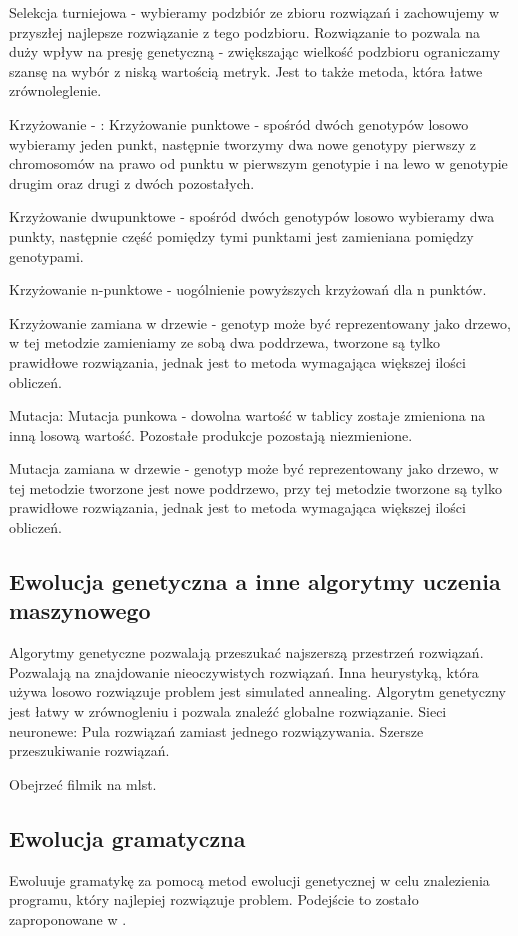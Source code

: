 Selekcja turniejowa - wybieramy podzbiór ze zbioru rozwiązań i zachowujemy w przyszłej najlepsze rozwiązanie z tego podzbioru.
Rozwiązanie to pozwala na duży wpływ na presję genetyczną - zwiększając wielkość podzbioru ograniczamy szansę na wybór z niską wartością metryk.  Jest to także metoda, która łatwe zrównoleglenie.

Krzyżowanie - :
Krzyżowanie punktowe - spośród dwóch genotypów losowo wybieramy jeden punkt, następnie tworzymy dwa nowe genotypy pierwszy z chromosomów na prawo od punktu w pierwszym genotypie i na lewo w genotypie drugim oraz drugi z dwóch pozostałych.

Krzyżowanie dwupunktowe - spośród dwóch genotypów losowo wybieramy dwa punkty, następnie część pomiędzy tymi punktami jest zamieniana pomiędzy genotypami.

Krzyżowanie n-punktowe - uogólnienie powyższych krzyżowań dla n punktów.

Krzyżowanie zamiana w drzewie - genotyp może być reprezentowany jako drzewo, w tej metodzie zamieniamy ze sobą dwa poddrzewa, tworzone są tylko prawidłowe rozwiązania, jednak jest to metoda wymagająca większej ilości obliczeń. 


Mutacja:
Mutacja punkowa - dowolna wartość w tablicy zostaje zmieniona na inną losową wartość. Pozostałe produkcje pozostają niezmienione.

Mutacja zamiana w drzewie - genotyp może być reprezentowany jako drzewo, w tej metodzie tworzone jest nowe poddrzewo, przy tej metodzie tworzone są tylko prawidłowe rozwiązania, jednak jest to metoda wymagająca większej ilości obliczeń. 

 
  
\subsection{Ewolucja genetyczna a inne algorytmy uczenia maszynowego}
Algorytmy genetyczne pozwalają przeszukać najszerszą przestrzeń rozwiązań. Pozwalają na znajdowanie nieoczywistych rozwiązań.  
Inna heurystyką, która używa losowo rozwiązuje problem jest simulated annealing. Algorytm genetyczny jest łatwy w zrównogleniu i pozwala znaleźć globalne rozwiązanie.
Sieci neuronewe:
Pula rozwiązań zamiast jednego rozwiązywania. Szersze przeszukiwanie rozwiązań. 

Obejrzeć filmik na mlst.
\subsection{Ewolucja gramatyczna}
Ewoluuje gramatykę za pomocą metod ewolucji genetycznej w celu znalezienia programu, który najlepiej rozwiązuje problem.
Podejście to zostało zaproponowane w \cite{ryan_collins_neill_1998}. 


